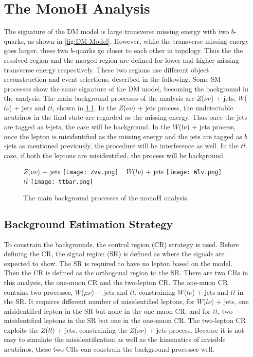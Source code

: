 \documentclass[class=NTHU_thesis, crop=false]{standalone}
\begin{document}
\chapter{The MonoH Analysis}
\label{chap:MonoH_Analysis}
The signature of the DM model is large transverse missing energy with two $b$-quarks, as shown in \cref{fig:DM-Model}. However, while the transverse missing energy goes larger, these two $b$-quarks go closer to each other in topology. Thus the the resolved region and the merged region are defined for lower and higher missing transverse energy respectively. These two regions use different object reconstruction and event selections, described in the following.
Some SM processes show the same signature of the DM model, becoming the background in the analysis. The main background processes of the analysis are $Z$($\nu\nu$) + jets, $W$($l\nu$) + jets and $t\bar{t}$, shown in \cref{fig:Bkg-Processes}. In the $Z$($\nu\nu$) + jets process, the undetectable neutrinos in the final state are regarded as the missing energy. Thus once the jets are tagged as $b$-jets, the case will be background. In the $W$($l\nu$) + jets process, once the lepton is misidentified as the missing energy and the jets are tagged as $b$-jets as mentioned previously, the procedure will be interference as well. In the $t\bar{t}$ case, if both the leptons are misidentified, the process will be background.

\begin{figure}[!hbt]
	\captionsetup[subfigure]{labelformat=empty}
	\centering
	\subcaptionbox
		{$Z$($\nu\nu$) + jets
		\label{fig:Bkg-Processes-fig1}}
		{\texttt{[image: Zvv.png]}}
	~
	\subcaptionbox
		{$W$($l\nu$) + jets
		\label{fig:Bkg-Processes-fig2}}
		{\texttt{[image: Wlv.png]}}
	~
	\subcaptionbox
		{$t\bar{t}$
		\label{fig:Bkg-Processes-fig3}}
		{\texttt{[image: ttbar.png]}}
	\caption{The main background processes of the monoH analysis.}
	\label{fig:Bkg-Processes}
\end{figure}

\section{Background Estimation Strategy}
To constrain the backgrounds, the control region (CR) strategy is used. Before defining the CR, the signal region (SR) is defined as where the signals are expected to show. The SR is required to have no lepton based on the model. Then the CR is defined as the orthogonal region to the SR. There are two CRs in this analysis, the one-muon CR and the two-lepton CR. The one-muon CR contains two processes, $W$($\mu\nu$) + jets and $t\bar{t}$, constraining $W$($l\nu$) + jets and $t\bar{t}$ in the SR. It requires different number of misidentified leptons, for $W$($l\nu$) + jets, one misidentified lepton in the SR but none in the one-muon CR, and for $t\bar{t}$, two misidentified leptons in the SR but one in the one-muon CR. The two-lepton CR exploits the $Z$($ll$) + jets, constraining the $Z$($\nu\nu$) + jets process. Because it is not easy to simulate the misidentification as well as the kinematics of invisible neutrinos, these two CRs can constrain the background processes well.
\end{document}
